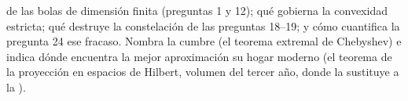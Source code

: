 \begin{problem}
\begin{enumerate}[resume]
         de las bolas de dimensión finita (preguntas 1 y
        12); qué gobierna la convexidad estricta; qué destruye la
        constelación de las preguntas 18--19; y cómo cuantifica la
        pregunta 24 ese fracaso. Nombra la cumbre (el teorema
        extremal de Chebyshev) e indica dónde encuentra la mejor
        aproximación su hogar moderno (el teorema de la proyección
        en espacios de Hilbert, volumen del tercer año, donde la
         sustituye a la ).
\end{enumerate}
\end{problem}

